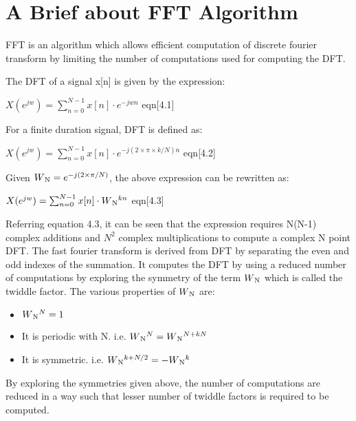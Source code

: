 \section{A Brief about FFT Algorithm}
FFT is an algorithm which allows efficient computation of discrete fourier transform by limiting the number of computations used for computing the DFT.

\vspace{0.25cm}
The DFT of a signal x[n] is given by the expression:

\hspace{3cm} $X(e^{jw}) =\sum_{n=0}^{N-1} x[n]\cdot e^{-jwn}$ \hfill eqn[4.1]

\vspace{0.25cm}
For a finite duration signal, DFT is defined as: 

\hspace{3cm} $X(e^{jw}) = \sum_{n=0}^{N-1} x[n]\cdot e^{-j(2\times \pi\times k/N)n}$ \hfill eqn[4.2] 

\vspace{0.25cm}
Given $W\textsubscript{N} =e^{-j(2\times \pi/N)}$, the above expression can be rewritten as:

\hspace{3cm} $X(e^{jw}) = \sum_{n=0}^{N-1} x[n]\cdot W\textsubscript{N}^{kn}$ \hfill eqn[4.3]

\vspace{0.25cm}
\noindent Referring equation 4.3, it can be seen that the expression requires N(N-1) complex additions and $N^{2}$ complex multiplications to compute a complex N point DFT.
\noindent The fast fourier transform is derived from DFT by separating the even and odd indexes of the summation. It computes the DFT by using a reduced number of computations by exploring the symmetry of the term $W\textsubscript{N}$ which is called the twiddle factor. The various properties of $W\textsubscript{N}$ are:
\begin{itemize}
    \item 
    $W\textsubscript{N}^{N}=1$
        \item 
        It is periodic with N. i.e. 
        $W\textsubscript{N}^{N} = W\textsubscript{N}^{N+kN}$
        \item
  It is symmetric. i.e. $W\textsubscript{N}^{k+N/2}= -W\textsubscript{N}^{k}$
\end{itemize}
By exploring the symmetries given above, the number of computations are reduced in a way such that lesser number of twiddle factors is required to be computed. 

